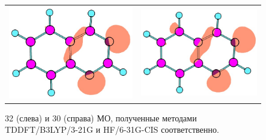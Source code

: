 \begin{figure}[H]
\center
\begin{tabular}{cc}
\includegraphics[scale=0.35]{fig/TDDFT-32.jpg}
&
\includegraphics[scale=0.35]{fig/CIS-30.jpg}
\end{tabular}
\caption{32 (слева) и 30 (справа) МО, полученные методами TDDFT/B3LYP/3-21G и HF/6-31G-CIS соответственно.}
\end{figure}

